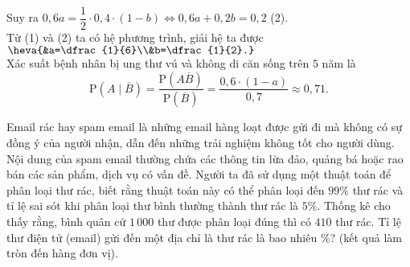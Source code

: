 \begin{ex}
{	Suy ra $0{,}6a=\dfrac{1}{2}\cdot0{,}4\cdot(1-b)\Leftrightarrow0{,}6a+0{,}2b=0{,}2$ \quad (2).\\
	Từ (1) và (2) ta có hệ phương trình, giải hệ ta được $\heva{&a=\dfrac{1}{6}\\&b=\dfrac{1}{2}.}$\\
	Xác suất bệnh nhân bị ung thư vú và không di căn sống trên $5$ năm là
	$$\mathrm{P}\left(A\mid \overline{B} \right)=\dfrac{\mathrm{P}\left(A\overline{B} \right) }{\mathrm{P}\left( \overline{B}\right) }=\dfrac{0{,}6\cdot(1-a)}{0{,7}}\approx0{,}71.$$
	}
\end{ex}

%

\begin{ex}%
	Email rác hay spam email là những email hàng loạt được gửi đi mà không có sự đồng ý của người nhận, dẫn đến những trải nghiệm không tốt cho người dùng. Nội dung của spam email thường chứa các thông tin lừa đảo, quảng bá hoặc rao bán các sản phẩm, dịch vụ có vấn đề. Người ta đã sử dụng một thuật toán để phân loại thư rác, biết rằng thuật toán này có thể phân loại đến $99\%$ thư rác và tỉ lệ sai sót khi phân loại thư bình thường thành thư rác là $5\%$. Thống kê cho thấy rằng, bình quân cứ $1\,000$ thư được phân loại đúng thì có $410$ thư rác. Tỉ lệ thư điện tử (email) gửi đến một địa chỉ là thư rác là bao nhiêu \%? (kết quả làm tròn đến hàng đơn vị).
	
	
\end{ex}

